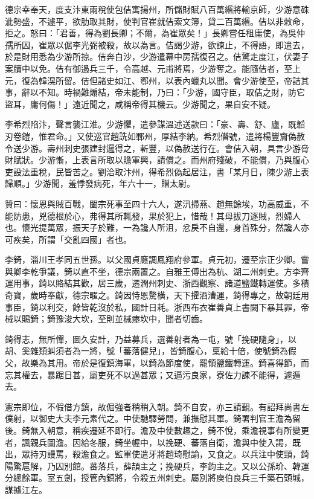 \begin{pinyinscope}
 德宗幸奉天，度支汴東兩稅使包佶寓揚州，所儲財賦八百萬緡將輸京師，少游意硃泚勢盛，不遽平，欲肋取其財，使判官崔就佶索文簿，貸二百萬緡。佶以非敕命，拒之。怒曰：「君善，得為劉長卿；不爾，為崔眾矣！」長卿嘗任租庸使，為吳仲孺所囚，崔眾以倨李光弼被殺，故以為言。佶謁少游，欲諫止，不得語，即遣去，於是財用悉為少游所掠。佶奔白沙，少游遣幕中房孺復召之。佶驚走度江，伏妻子案牘中以免。佶有御遏兵三千，令高越、元甫將焉，少游奪之。能隨佶者，至上元，復為韓滉所留。佶但諸史如江、鄂州，以表內蠟丸以聞。會少游使至，帝詰其事，辭以不知。時禍難煽結，帝未能制，乃曰：「少游，國守臣，取佶之財，防它盜耳，庸何傷！」遠近聞之，咸稱帝得其機云。少游聞之，果自安不疑。



 李希烈陷汴，聲言襲江淮。少游懼，遣參謀溫述送款曰：「豪、壽、舒、廬，既韜刃卷鎧，惟君命。」又使巡官趙詵如鄆州，厚結李納。希烈僭號，遣將楊豐齎偽赦令送少游。壽州刺史張建封邏得之，斬豐，以偽赦送行在。會佶入朝，具言少游脅財賦狀。少游慚，上表言所取以贍軍興，請償之。而州府殘破，不能償，乃與腹心吏設法重稅，民皆苦之。劉洽取汴州，得希烈偽起居注，書「某月日，陳少游上表歸順。」少游聞，羞悸發病死，年六十一，贈太尉。



 贊曰：懷恩與賊百戰，闔宗死事至四十六人，遂汛掃燕、趙無餘埃，功高威重，不能防患，兇德根於心，弗得其所輒發，果於犯上，惜哉！其母拔刀逐賊，烈婦人也。懷光提萬眾，振天子於難，一為讒人所沮，忿戾不自還，身首殊分，然讒人亦可疾矣，所謂「交亂四國」者也。



 李錡，淄川王孝同五世孫。以父國貞廕調鳳翔府參軍。貞元初，遷至宗正少卿。嘗與卿李乾爭議，錡以直不坐，德宗兩置之。自雅王傅出為杭、湖二州刺史。方李齊運用事，錡以賂結其歡，居三歲，遷潤州刺史、浙西觀察、諸道鹽鐵轉運使。多積奇寶，歲時奉獻，德宗暱之。錡因恃恩驁橫，天下攉酒漕運，錡得專之，故朝廷用事臣，錡以利交，餘皆乾沒於私，國計日耗。浙西布衣崔善貞上書闕下暴其罪，帝械以賜錡；錡豫浚大坎，至則並械瘞坎中，聞者切齒。



 錡得志，無所憚，圖久安計，乃益募兵，選善射者為一屯，號「挽硬隨身」，以胡、奚雜類虯須者為一將，號「蕃落健兒」，皆錡腹心，稟給十倍，使號錡為假父，故樂為其用。帝於是復鎮海軍，以錡為節度使，罷領鹽鐵轉運。錡喜得節，而忘其權去，暴踞日甚，屬吏死不以過甚眾；又逼污良家，寮佐力諫不能得，遽遁去。



 憲宗即位，不假借方鎮，故倔強者稍稍入朝。錡不自安，亦三請覲。有詔拜尚書左僕射，以御史大夫李元素代之。中使馳驛勞問，兼撫慰其軍。錡署判官王澹為留後。錡無入朝意，稱疾遷延不即行。澹及中使數趣之，錡不悅，乘澹視事有所變更者，諷親兵圖澹。因給冬服，錡坐幄中，以挽硬、蕃落自衛，澹與中使入謁，既出，眾持刃謾罵，殺澹食之。監軍使遣牙將趙琦慰諭，又食之。以兵注中使頸，錡陽驚扈解，乃囚別館。蕃落兵，薛頡主之；挽硬兵，李鈞主之。又以公孫玠、韓運分總餘軍。室五劍，授管內鎮將，令殺五州刺史。屬別將庾伯良兵三千築石頭城，謀據江左。




\end{pinyinscope}

